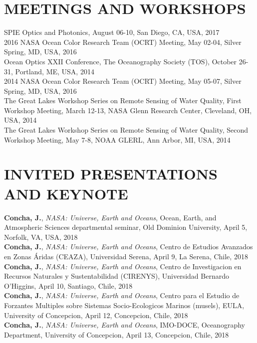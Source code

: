 \documentclass[11pt]{res} %
\begin{document}
\begin{resume}
\section{MEETINGS AND WORKSHOPS}
\vspace{0.1in}
SPIE Optics and Photonics,  August 06-10, San Diego, CA, USA, 2017
\vspace{0.1in}\\
2016 NASA Ocean Color Research Team (OCRT) Meeting,  May 02-04, Silver Spring, MD, USA, 2016
\vspace{0.1in}\\
Ocean Optics XXII Conference, The Oceanography Society (TOS),  October 26-31, Portland, ME, USA, 2014
\vspace{0.1in}\\
2014 NASA Ocean Color Research Team (OCRT) Meeting,  May 05-07, Silver Spring, MD, USA, 2016
\vspace{0.1in}\\
The Great Lakes Workshop Series on Remote Sensing of Water Quality, First Workshop Meeting, March 12-13, NASA Glenn Research Center, Cleveland, OH, USA, 2014
\vspace{0.1in}\\
The Great Lakes Workshop Series on Remote Sensing of Water Quality, Second Workshop Meeting, May 7-8, NOAA GLERL, Ann Arbor, MI, USA, 2014\\

\vspace{-0.1in}
\section{INVITED PRESENTATIONS AND KEYNOTE}
\vspace{0.1in}
{\bf Concha, J.}, {\it NASA: Universe, Earth and Oceans}, Ocean, Earth, and Atmospheric Sciences departmental seminar, Old Dominion University, April 5, Norfolk, VA, USA, 2018
\vspace{0.1in}\\
{\bf Concha, J.}, {\it NASA: Universe, Earth and Oceans}, Centro de Estudios Avanzados en Zonas Áridas (CEAZA), Universidad Serena, April 9, La Serena, Chile, 2018
\vspace{0.1in}\\
{\bf Concha, J.}, {\it NASA: Universe, Earth and Oceans}, Centro de Investigacion en Recursos Naturales y Sustentabilidad (CIRENYS), Universidad Bernardo O'Higgins, April 10, Santiago, Chile, 2018
\vspace{0.1in}\\
{\bf Concha, J.}, {\it NASA: Universe, Earth and Oceans}, Centro para el Estudio de Forzantes Multiples sobre Sistemas Socio-Ecologicos Marinos (musels), EULA, University of Concepcion, April 12, Concepcion, Chile, 2018
\vspace{0.1in}\\
{\bf Concha, J.}, {\it NASA: Universe, Earth and Oceans}, IMO-DOCE, Oceanography Department, University of Concepcion, April 13, Concepcion, Chile, 2018
\vspace{0.1in}\\
\vspace{-0.1in}

\end{resume}
\end{document}
